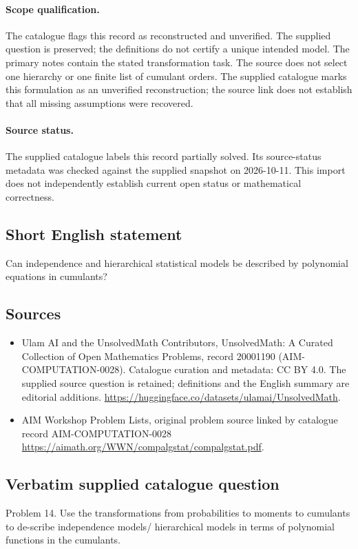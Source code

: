 \documentclass[11pt]{article}
\begin{document}
\paragraph{Scope qualification.}
The catalogue flags this record as reconstructed and unverified. The supplied question is preserved; the definitions do not certify a unique intended model. The primary notes contain the stated transformation task. The source does not select one hierarchy or one finite list of cumulant orders.
The supplied catalogue marks this formulation as an unverified reconstruction; the source link does not establish that all missing assumptions were recovered.
\paragraph{Source status.}
The supplied catalogue labels this record partially solved. Its source-status metadata was checked against the supplied snapshot on 2026-10-11. This import does not independently establish current open status or mathematical correctness.
\subsection{Short English statement}
Can independence and hierarchical statistical models be described by polynomial equations in cumulants?
\subsection{Sources}
\begin{itemize}
\item[S1] Ulam AI and the UnsolvedMath Contributors, UnsolvedMath: A Curated Collection of Open Mathematics Problems, record 20001190 (AIM-COMPUTATION-0028). Catalogue curation and metadata: CC BY 4.0. The supplied source question is retained; definitions and the English summary are editorial additions.
\url{https://huggingface.co/datasets/ulamai/UnsolvedMath}.
\item[S2] AIM Workshop Problem Lists, original problem source linked by catalogue record AIM-COMPUTATION-0028
\url{https://aimath.org/WWN/compalgstat/compalgstat.pdf}.
\end{itemize}
\subsection{Verbatim supplied catalogue question}
Problem 14. Use the transformations from probabilities to moments to cumulants to de-scribe independence models/ hierarchical models in terms of polynomial functions in the cumulants.
\end{document}
